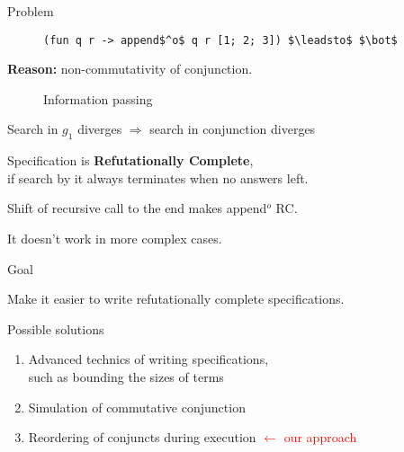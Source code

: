 \documentclass[final]{beamer}
\newlength{\onecolwid}
\begin{document}
\begin{frame}[fragile]
\begin{columns}[t]
\begin{column}{\onecolwid}
\begin{block}{Problem}
\begin{itemize}
\begin{figure}
\begin{lstlisting}
(fun q r -> append$^o$ q r [1; 2; 3]) $\leadsto$ $\bot$
\end{lstlisting}
\end{figure}

\end{itemize}

\textbf{Reason:} non-commutativity of conjunction.

\begin{figure}

\Large{Information passing}\\


\end{figure}


Search in $g_1$ diverges $\Rightarrow$ search in conjunction diverges

\bigskip

\bigskip

Specification is \textbf{Refutationally Complete}, \\ if search by it always terminates when no answers left. 

Shift of recursive call to the end makes {\ttfamily append$^o$} RC.

It doesn't work in more complex cases.

\end{block}


\begin{alertblock}{Goal}

Make it easier to write refutationally complete specifications.

\end{alertblock}


\begin{block}{Possible solutions}

\begin{enumerate}
  \item Advanced technics of writing specifications, \\ such as bounding the sizes of terms
  \item Simulation of commutative conjunction
  \item Reordering of conjuncts during execution \textcolor{red}{ $\leftarrow$ our approach }
\end{enumerate}


\end{block}
\end{column}
\end{columns}
\end{frame}
\end{document}
